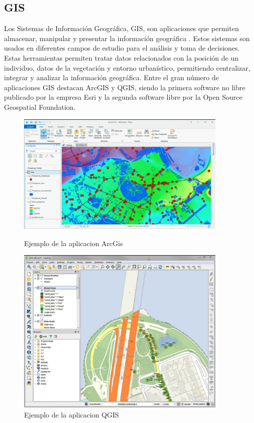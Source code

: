 \subsection{GIS} \label{section:GIS}
Los Sistemas de Información Geográfica, \ac{GIS}, son aplicaciones que permiten 
almacenar, manipular y presentar la información geográfica \cite{EPA01}. Estos 
sistemas son usados en diferentes campos de estudio para el análisis y toma de 
decisiones. Estas herramientas permiten tratar datos relacionados con la posición de un 
individuo, datos de la vegetación y entorno urbanístico, permitiendo centralizar, integrar 
y analizar la información geográfica. Entre el gran número de aplicaciones GIS destacan 
ArcGIS y QGIS, siendo la primera software no libre publicado por la empresa Esri y la 
segunda software libre por la Open Source Geospatial Foundation.
\begin{figure}[!htb]
\begin{minipage}{0.48\textwidth}
\centering
\includegraphics[width=0.9\textwidth]{./Imagenes/ArcGIS.png}
\caption{Ejemplo de la aplicacion ArcGis}
\label{figure:ArcGis01}
\end{minipage}\hfill
\begin{minipage}{0.48\textwidth}
\centering
\includegraphics[width=0.9\textwidth]{./Imagenes/QGIS.png}
\caption{Ejemplo de la aplicacion QGIS}
\label{figure:QGIS01}
\end{minipage}
\end{figure}


